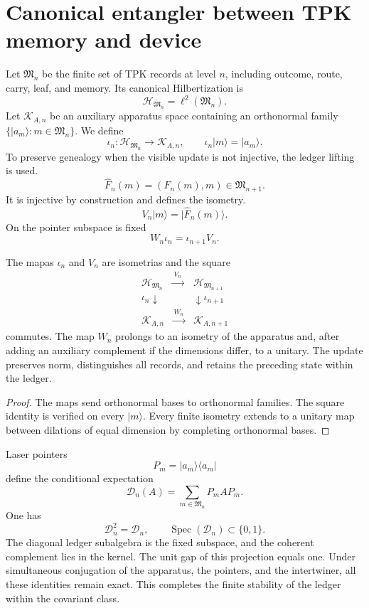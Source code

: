 \section{Canonical entangler between TPK memory and device}
\label{sec:hmtf2-aparato-memoria}

Let \(\mathfrak M_n\) be the finite set of TPK records at level \(n\),
including outcome, route, carry, leaf, and memory. Its canonical
Hilbertization is
\[
 \mathcal H_{\mathfrak M_n}
 =\ell^2(\mathfrak M_n).
\]
Let \(\mathcal K_{A,n}\) be an auxiliary apparatus space containing an
orthonormal family
\(\{|a_m\rangle:m\in\mathfrak M_n\}\). We define
\[
 \iota_n:\mathcal H_{\mathfrak M_n}\longrightarrow\mathcal K_{A,n},
 \qquad
 \iota_n|m\rangle=|a_m\rangle.
\]
To preserve genealogy when the visible update is not injective,
the ledger lifting is used.
\[
 \widehat F_n(m)=(F_n(m),m)\in\mathfrak M_{n+1}.
\]
It is injective by construction and defines the isometry.
\[
 V_n|m\rangle=|\widehat F_n(m)\rangle.
\]
On the pointer subspace is fixed
\[
 W_n\iota_n=\iota_{n+1}V_n.
\]

\begin{theorem}
\label{thm:hmtf2-entrelazador-memoria}
The mapas \(\iota_n\) and \(V_n\) are isometrias and the square
\[
 \begin{array}{ccc}
 \mathcal H_{\mathfrak M_n}&\xrightarrow{\ V_n\ }&
 \mathcal H_{\mathfrak M_{n+1}}\\
 {\scriptstyle\iota_n}\downarrow&&\downarrow{\scriptstyle\iota_{n+1}}\\
 \mathcal K_{A,n}&\xrightarrow{\ W_n\ }&
 \mathcal K_{A,n+1}
 \end{array}
\]
commutes. The map \(W_n\) prolongs to an isometry of the apparatus and,
after adding an auxiliary complement if the dimensions differ, to a unitary.
The update preserves norm, distinguishes all records, and retains the
preceding state within the ledger.
\end{theorem}

\begin{proof}
The maps send orthonormal bases to orthonormal families. The square
identity is verified on every \(|m\rangle\). Every finite isometry
extends to a unitary map between dilations of equal dimension by completing
orthonormal bases.
\end{proof}

Laser pointers
\[
 P_m=|a_m\rangle\langle a_m|
\]
define the conditional expectation
\[
 \mathcal D_n(A)=\sum_{m\in\mathfrak M_n}P_m A P_m.
\]
One has
\[
 \mathcal D_n^2=\mathcal D_n,\qquad
 \operatorname{Spec}(\mathcal D_n)\subset\{0,1\}.
\]
The diagonal ledger subalgebra is the fixed subspace, and the coherent complement lies in the kernel. The unit gap of this projection equals one. Under simultaneous conjugation of the apparatus, the pointers, and the intertwiner, all these identities remain exact. This completes the finite stability of the ledger within the covariant class.


